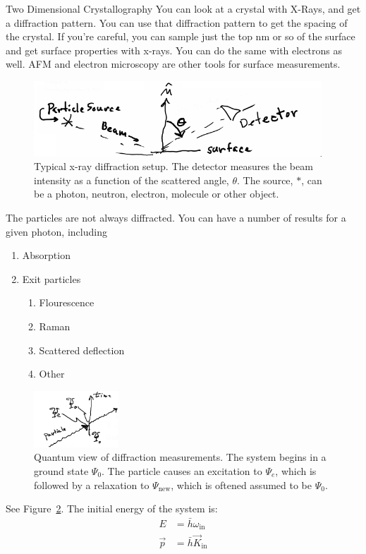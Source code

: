 \documentclass{article}
\begin{document}
\begin{section}{Two Dimensional Crystallography}
You can look at a crystal with X-Rays, and get a diffraction pattern. You can use that diffraction pattern to get the spacing of the crystal.
If you're careful, you can sample just the top nm or so of the surface and get surface properties with x-rays. You can do the same with electrons as well.
AFM and electron microscopy are other tools for surface measurements.

\begin{figure}[h]
	\centering
	\includegraphics[height=080pt]{xrdDiffraction}
	\caption{Typical x-ray diffraction setup. The detector measures the beam intensity as a function of the scattered angle, $\theta$. The source, $\ast$, can be a photon, neutron, electron, molecule or other object.}
	\label{fig:xrd}
\end{figure}

The particles are not always diffracted. You can have a number of results for a given photon, including
\begin{enumerate}
	\item Absorption
	\item Exit particles
		\begin{enumerate}
			\item Flourescence
			\item Raman
			\item Scattered deflection
			\item Other
		\end{enumerate}
\end{enumerate}
\begin{figure}[h]
	\centering
	\includegraphics[height=60pt]{xrdDiffraction2}
	\caption{Quantum view of diffraction measurements. The system begins in a ground state $\Psi_0$. The particle causes an excitation to $\Psi_e$, which is followed by a relaxation to $\Psi_\text{new}$, which is oftened assumed to be $\Psi_0$.}
	\label{fig:quantumxrd}
\end{figure}
See Figure~\ref{fig:quantumxrd}. The initial energy of the system is:
\begin{align*}
	E &= \bar{h}\omega_\text{in}\\
	\vec{p} &= \bar{h}\vec{K}_\text{in}
\end{align*}


\end{section}
\end{document}
